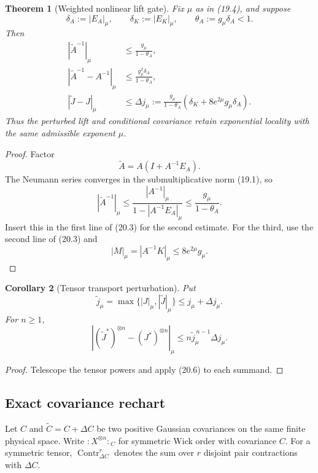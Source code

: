\documentclass[11pt,oneside]{book}
\newtheorem{theorem}{Theorem}[chapter]
\newtheorem{corollary}[theorem]{Corollary}
\theoremstyle{definition}
\theoremstyle{remark}
\begin{document}
\begin{theorem}[Weighted nonlinear lift gate]
\label{thm:e8v20-weighted}
Fix \(\mu\) as in (19.4), and suppose
\[
 \delta_A:=|E_A|_\mu,\qquad
 \delta_K:=|E_K|_\mu,\qquad
 \theta_A:=g_\mu\delta_A<1.                        \tag{20.5}
\]
Then
\[
\boxed{
\begin{aligned}
|\widetilde A^{-1}|_\mu
 &\leq\frac{g_\mu}{1-\theta_A},\\
|\widetilde A^{-1}-A^{-1}|_\mu
 &\leq\frac{g_\mu^2\delta_A}{1-\theta_A},\\
|\widetilde J-J|_\mu
 &\leq\Delta j_\mu:=
 \frac{g_\mu}{1-\theta_A}
 \left(\delta_K+8e^{2\mu}g_\mu\delta_A\right).
\end{aligned}}                                                     \tag{20.6}
\]
Thus the perturbed lift and conditional covariance retain exponential
locality with the same admissible exponent \(\mu\).
\end{theorem}

\begin{proof}
Factor
\[
\widetilde A=A(I+A^{-1}E_A).
\]
The Neumann series converges in the submultiplicative norm (19.1), so
\[
|\widetilde A^{-1}|_\mu
\leq\frac{|A^{-1}|_\mu}{1-|A^{-1}E_A|_\mu}
\leq\frac{g_\mu}{1-\theta_A}.
\]
Insert this in the first line of (20.3) for the second estimate.
For the third, use the second line of (20.3) and
\[
 |M|_\mu=|A^{-1}K|_\mu
\leq8e^{2\mu}g_\mu.
\]
\end{proof}

\begin{corollary}[Tensor transport perturbation]
\label{cor:e8v20-tensor}
Put
\[
 \widetilde j_\mu=\max\{|J|_\mu,|\widetilde J|_\mu\}
 \leq j_\mu+\Delta j_\mu.
\]
For \(n\geq1\),
\[
\left|
(\widetilde J^*)^{\otimes n}-(J^*)^{\otimes n}
\right|_\mu
\leq n\widetilde j_\mu^{\,n-1}\Delta j_\mu.         \tag{20.7}
\]
\end{corollary}

\begin{proof}
Telescope the tensor powers and apply (20.6) to each summand.
\end{proof}

\subsection{Exact covariance rechart}

Let \(C\) and \(\widetilde C=C+\Delta C\) be two positive Gaussian
covariances on the same finite physical space.  Write
\({:X^{\otimes n}:}_C\) for symmetric Wick order with covariance \(C\).
For a symmetric tensor, \(\operatorname{Contr}_{\Delta C}^r\) denotes
the sum over \(r\) disjoint pair contractions with \(\Delta C\).
\end{document}
